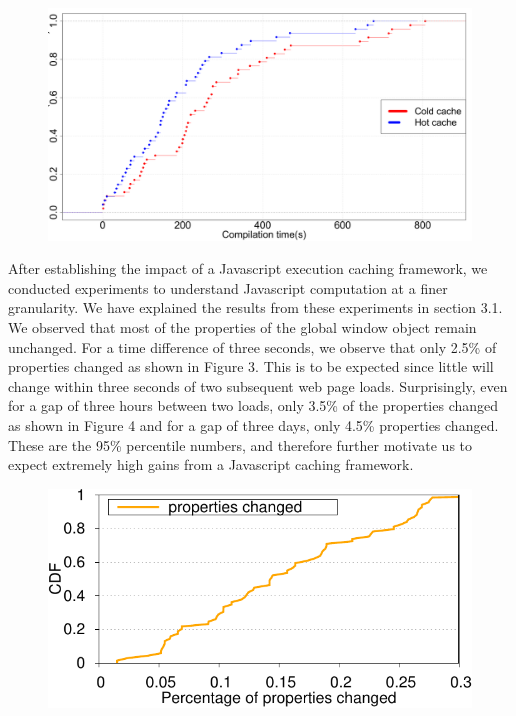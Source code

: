 \begin{figure}[t]
\centering
\includegraphics[width=0.9\columnwidth]{figs/chrome_compile.png}
\label{fig:compile_p2}
\end{figure}

After establishing the impact of a Javascript execution caching framework, we conducted
experiments to understand Javascript computation at a finer granularity. We have explained the
results from these experiments in section 3.1. 
We observed that most of the properties of the global window object remain unchanged.
For a time difference of three seconds, we observe that only 2.5\% of properties
changed as shown in Figure 3. This is to be expected since little will change within three seconds 
of two subsequent web page loads. Surprisingly, even for a gap of three hours between
two loads, only 3.5\% of the properties changed as shown in Figure 4 and for a gap
 of three days, only 4.5\% 
properties changed. These are the 95\% percentile numbers, and therefore 
further motivate us to expect extremely high gains from a Javascript caching
framework. 

\begin{figure}[t]
\centering
\includegraphics[width=0.9\columnwidth]{figs/cdf_bigdata_sec_new.pdf}
\label{fig:properties-sec}
\end{figure}

